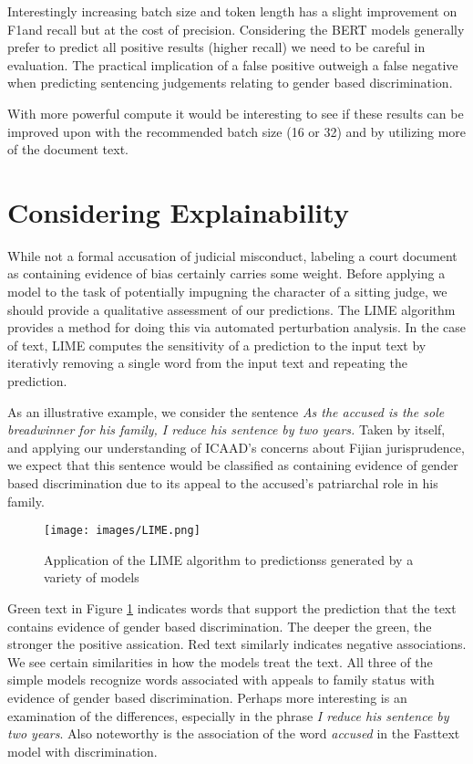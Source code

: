 \documentclass[twocolumn,10pt]{wmrDoc}
\begin{document}
Interestingly increasing batch size and token length has a slight improvement on F1and recall but at the cost of precision. Considering the BERT models generally prefer to predict all positive results (higher recall) we need to be careful in evaluation. The practical implication of a false positive outweigh a false negative when predicting sentencing judgements relating to gender based discrimination.

With more powerful compute it would be interesting to see if these results can be improved upon with the recommended batch size (16 or 32) and by utilizing more of the document text.

\section{Considering Explainability}
While not a formal accusation of judicial misconduct, labeling a court document as containing evidence of bias certainly carries some weight.  Before applying a model to the task of potentially impugning the character of a sitting judge, we should provide a qualitative assessment of our predictions.  The LIME algorithm \cite{lime} provides a method for doing this via automated perturbation analysis.  In the case of text, LIME computes the sensitivity of a prediction to the input text by iterativly removing a single word from the input text and repeating the prediction.  

As an illustrative example, we consider the sentence \emph{As the accused is the sole breadwinner for his family, I reduce his sentence by two years.}  Taken by itself, and applying our understanding of ICAAD's concerns about Fijian jurisprudence, we expect that this sentence would be classified as containing evidence of gender based discrimination due to its appeal to the accused's patriarchal role in his family.

\begin{figure}[h]
    \centering
    \texttt{[image: images/LIME.png]}
    \caption{Application of the LIME algorithm to predictionss generated by a variety of models}
    \label{fig:LIME}
\end{figure}

Green text in Figure \ref{fig:LIME} indicates words that support the prediction that the text contains evidence of gender based discrimination.  The deeper the green, the stronger the positive assication.  Red text similarly indicates negative associations.  We see certain similarities in how the models treat the text.  All three of the simple models recognize words associated with appeals to family status with evidence of gender based discrimination.  Perhaps more interesting is an examination of the differences, especially in the phrase \emph{I reduce his sentence by two years}.  Also noteworthy is the association of the word \emph{accused} in the Fasttext model with discrimination.
\end{document}
